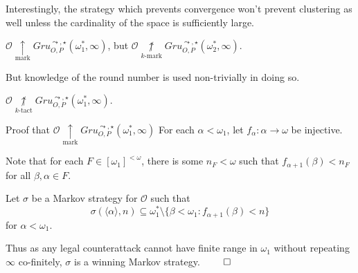 \documentclass{beamer}
\theoremstyle{definition}
\newcommand{\markwin}{\underset{\text{mark}}{\uparrow}}
\newcommand{\notkmarkwin}[1]{\underset{#1\text{-mark}}{\not\uparrow}}
\newcommand{\notktactwin}[1]{\underset{#1\text{-tact}}{\not\uparrow}}
\newcommand{\oneptcomp}[1]{#1^*}
\newcommand{\gruClusGameHard}[2]{Gru_{O,P}^{\leadsto,\star}\left({#1},{#2}\right)}
\newcommand{\<}{\langle}
\renewcommand{\>}{\rangle}
\newcommand{\pl}[1]{\mathscr{#1}}
\begin{document}
\begin{frame}
  Interestingly, the strategy which prevents convergence won't
  prevent clustering as well unless the cardinality of the space is
  sufficiently large.

  \begin{theorem}
    $\pl O\markwin \gruClusGameHard{\oneptcomp\omega_1}{\infty}$, but
    $\pl O\notkmarkwin{k}\gruClusGameHard{\oneptcomp\omega_2}{\infty}$.
  \end{theorem}

  \pause

  But knowledge of the round number is used non-trivially in doing so.

  \begin{theorem}
    $\pl O\notktactwin{k}\gruClusGameHard{\oneptcomp\omega_1}{\infty}$.
  \end{theorem}
\end{frame}

\begin{frame}{
  Proof that $\pl O\markwin \gruClusGameHard{\oneptcomp\omega_1}{\infty}$
}\small
  For each $\alpha<\omega_1$, let $f_\alpha:\alpha\to\omega$ be injective.

  \vpause

  Note that for each $F\in[\omega_1]^{<\omega}$, there is some $n_F<\omega$
  such that $f_{\alpha+1}(\beta)<n_F$ for all $\beta,\alpha\in F$.

  \vpause

  Let $\sigma$ be a Markov strategy for $\pl O$ such that
    \[
      \sigma(\<\alpha\>,n)
        \subseteq
      \oneptcomp\omega_1 \setminus
      \{\beta<\omega_1:f_{\alpha+1}(\beta)<n\}
    \]
  for $\alpha<\omega_1$.

  \vpause

  Thus as any legal counterattack cannot have finite range in $\omega_1$
  without repeating $\infty$ co-finitely,
  $\sigma$ is a winning Markov strategy. $\qed$
\end{frame}
\end{document}
